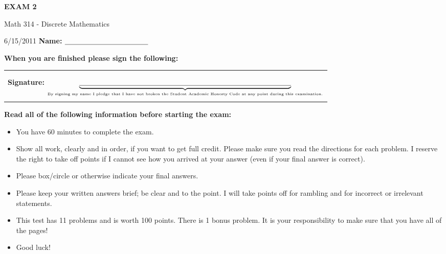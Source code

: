 \documentclass[10pt]{exam}
\begin{document}

\centerline{\huge \bf EXAM 2}        
\vspace{2pc} 
Math 314 - Discrete Mathematics                               %

6/15/2011 \hfill                             %
{\bf Name: } $\underline{\hbox{~~~~~~~~~~~~~~~~~~~~~~~~~~~~~~~~~~~}}$\\

\begin{center}{\bf When you are finished please sign the following:}\end{center}
\begin{center}
    \begin{tabular}{ | c |}
    \hline
\\
\\
    {\bf Signature: } $\underbrace{\underline{\hbox{~~~~~~~~~~~~~~~~~~~~~~~~~~~~~~~~~~~~~~~~~~~~~~~~~~~~~~~~~~~~~~~~~~~~~~~~~~~~~~~~~~~~~~~~~}}}_{\mbox{\tiny By signing my name I pledge that I have not broken the Student Academic Honesty Code at any point during this examination.}}$ \\
\\  
  \hline
    \end{tabular}
\end{center}

{\bf Read all of the following information before starting the exam:}
\vspace{1pc}

\begin{itemize}                        %
	\item You have 60 minutes to complete the exam.
	\item  Show all work, clearly and in order, if you want to get full
	credit.  Please make sure you read the directions for each problem.  I reserve the right to take off points if I cannot see how you 
	arrived at your answer (even if your final answer is correct).
	
	\item  Please box/circle or otherwise indicate your final answers.

	\item  Please keep your written answers brief; be clear and to the point.
	I will take points off for rambling and for incorrect or irrelevant 
	statements.
		
	\item  This test has 11 problems  %
	and is worth 100 points.  There is 1 bonus problem.  It is your responsibility to 
	make sure that you have all of the pages!
	
	\item  Good luck!
\end{itemize}
\end{document}

